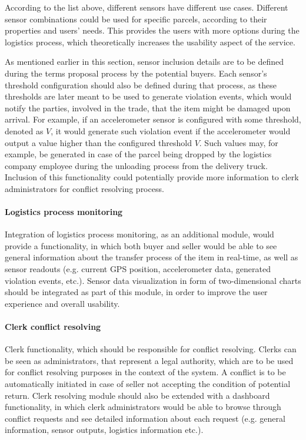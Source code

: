 According to the list above, different sensors have different use cases. Different sensor combinations could be used for specific parcels, according to their properties and users' needs. This provides the users with more options during the logistics process, which theoretically increases the usability aspect of the service.

As mentioned earlier in this section, sensor inclusion details are to be defined during the terms proposal process by the potential buyers. Each sensor's threshold configuration should also be defined during that process, as these thresholds are later meant to be used to generate violation events, which would notify the parties, involved in the trade, that the item might be damaged upon arrival. For example, if an accelerometer sensor is configured with some threshold, denoted as $V$, it would generate such violation event if the accelerometer would output a value higher than the configured threshold $V$. Such values may, for example, be generated in case of the parcel being dropped by the logistics company employee during the unloading process from the delivery truck. Inclusion of this functionality could potentially provide more information to clerk administrators for conflict resolving process.

\paragraph{Logistics process monitoring}
Integration of logistics process monitoring, as an additional module, would provide a functionality, in which both buyer and seller would be able to see general information about the transfer process of the item in real-time, as well as sensor readouts (e.g. current GPS position, accelerometer data, generated violation events, etc.). Sensor data visualization in form of two-dimensional charts should be integrated as part of this module, in order to improve the user experience and overall usability.

\paragraph{Clerk conflict resolving}
Clerk functionality, which should be responsible for conflict resolving. Clerks can be seen as administrators, that represent a legal authority, which are to be used for conflict resolving purposes in the context of the system. A conflict is to be automatically initiated in case of seller not accepting the condition of potential return. Clerk resolving module should also be extended with a dashboard functionality, in which clerk administrators would be able to browse through conflict requests and see detailed information about each request (e.g. general information, sensor outputs, logistics information etc.).

